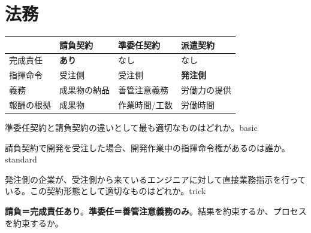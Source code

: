 \section{法務}

\mondaipage
{}

\begin{center}
\begin{tabularx}{\textwidth}{lXXX}
  \toprule
  & \textbf{請負契約} & \textbf{準委任契約} & \textbf{派遣契約} \\
  \midrule
  完成責任 & \textbf{あり} & なし & なし \\
  指揮命令 & 受注側 & 受注側 & \textbf{発注側} \\
  義務 & 成果物の納品 & 善管注意義務 & 労働力の提供 \\
  報酬の根拠 & 成果物 & 作業時間/工数 & 労働時間 \\
  \bottomrule
\end{tabularx}
\end{center}


\begin{mondai}{準委任契約と請負契約の違いとして最も適切なものはどれか。}{basic}
\end{mondai}

\begin{mondai}{請負契約で開発を受注した場合、開発作業中の指揮命令権があるのは誰か。}{standard}
\end{mondai}

\begin{mondai}{発注側の企業が、受注側から来ているエンジニアに対して直接業務指示を行っている。この契約形態として適切なものはどれか。}{trick}
\end{mondai}

\kaitoupage

\begin{kaisetsu}
\textbf{請負＝完成責任あり}。\textbf{準委任＝善管注意義務のみ}。結果を約束するか、プロセスを約束するか。
\end{kaisetsu}

